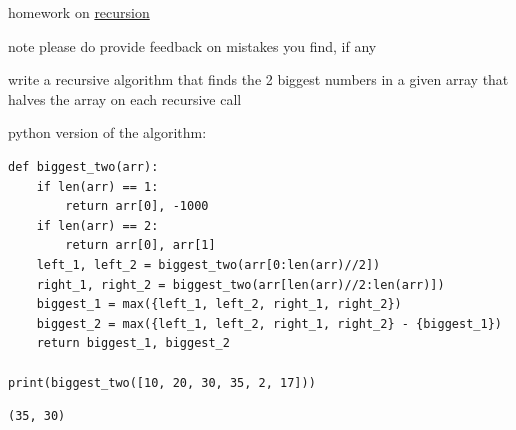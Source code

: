 \documentclass[a4paper,12pt]{article}
\begin{document}
\newenvironment{note}
  {\begin{bclogo}[logo=\bcinfo, couleurBarre=orange, couleur=lightgray]{ note}}
  {\end{bclogo}}
\newenvironment{attention}
  {\begin{bclogo}[logo=\bcattention, couleurBarre=red, noborder=true, 
                couleur=red!15]{Important!}}
  {\end{bclogo}}

homework on \href{20221105001640-recursive_function.org}{recursion}\\
\begin{note}
please do provide feedback on mistakes you find, if any\\
\end{note}
\begin{question}
write a recursive algorithm that finds the 2 biggest numbers in a given array that halves the array on each recursive call\\
\begin{answer}
\begin{center}

\end{center}

python version of the algorithm:\\
\lstset{language=Python,label= ,caption= ,captionpos=b,numbers=none}
\begin{lstlisting}
def biggest_two(arr):
    if len(arr) == 1:
        return arr[0], -1000
    if len(arr) == 2:
        return arr[0], arr[1]
    left_1, left_2 = biggest_two(arr[0:len(arr)//2])
    right_1, right_2 = biggest_two(arr[len(arr)//2:len(arr)])
    biggest_1 = max({left_1, left_2, right_1, right_2})
    biggest_2 = max({left_1, left_2, right_1, right_2} - {biggest_1})
    return biggest_1, biggest_2

print(biggest_two([10, 20, 30, 35, 2, 17]))
\end{lstlisting}
\begin{verbatim}
(35, 30)
\end{verbatim}
\end{answer}


\end{question}
\end{document}
